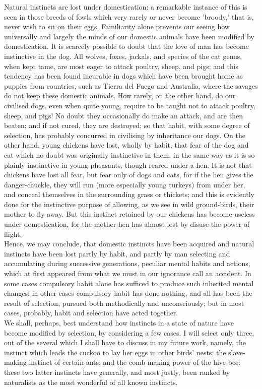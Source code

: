 \indent Natural instincts are lost under domestication: a remarkable instance of this is seen in those breeds of fowls which very rarely or never become 'broody,' that is, never wish to sit on their eggs. Familiarity alone prevents our seeing how universally and largely the minds of our domestic animals have been modified by domestication. It is scarcely possible to doubt that the love of man has become instinctive in the dog. All wolves, foxes, jackals, and species of the cat genus, when kept tame, are most eager to attack poultry, sheep, and pigs; and this tendency has been found incurable in dogs which have been brought home as puppies from countries, such as Tierra del Fuego and Australia, where the savages do not keep these domestic animals. How rarely, on the other hand, do our civilised dogs, even when quite young, require to be taught not to attack poultry, sheep, and pigs! No doubt they occasionally do make an attack, and are then beaten; and if not cured, they are destroyed; so that habit, with some degree of selection, has probably concurred in civilising by inheritance our dogs. On the other hand, young chickens have lost, wholly by habit, that fear of the dog and cat which no doubt was originally instinctive in them, in the same way as it is so plainly instinctive in young pheasants, though reared under a hen. It is not that chickens have lost all fear, but fear only of dogs and cats, for if the hen gives the danger-chuckle, they will run (more especially young turkeys) from under her, and conceal themselves in the surrounding grass or thickets; and this is evidently done for the instinctive purpose of allowing, as we see in wild ground-birds, their mother to fly away. But this instinct retained by our chickens has become useless under domestication, for the mother-hen has almost lost by disuse the power of flight.\\
\indent Hence, we may conclude, that domestic instincts have been acquired and natural instincts have been lost partly by habit, and partly by man selecting and accumulating during successive generations, peculiar mental habits and actions, which at first appeared from what we must in our ignorance call an accident. In some cases compulsory habit alone has sufficed to produce such inherited mental changes; in other cases compulsory habit has done nothing, and all has been the result of selection, pursued both methodically and unconsciously; but in most cases, probably, habit and selection have acted together.\\
\indent We shall, perhaps, best understand how instincts in a state of nature have become modified by selection, by considering a few cases.  I will select only three, out of the several which I shall have to discuss in my future work, namely, the instinct which leads the cuckoo to lay her eggs in other birds' nests; the slave-making instinct of certain ants; and the comb-making power of the hive-bee: these two latter instincts have generally, and most justly, been ranked by naturalists as the most wonderful of all known instincts.\\
